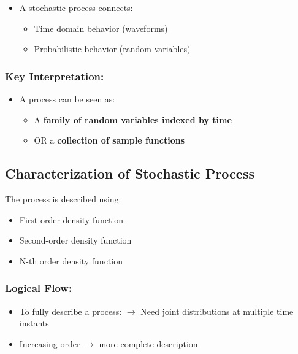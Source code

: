 \documentclass[12pt]{article}
\begin{document}
\begin{itemize}
    \item A stochastic process connects:
    \begin{itemize}
        \item Time domain behavior (waveforms)
        \item Probabilistic behavior (random variables)
    \end{itemize}
\end{itemize}

\subsubsection*{Key Interpretation:}

\begin{itemize}
    \item A process can be seen as:
    \begin{itemize}
        \item A \textbf{family of random variables indexed by time}
        \item OR a \textbf{collection of sample functions}
    \end{itemize}
\end{itemize}

\subsection{Characterization of Stochastic Process}

The process is described using:

\begin{itemize}
    \item First-order density function
    \item Second-order density function
    \item N-th order density function
\end{itemize}

\subsubsection*{Logical Flow:}

\begin{itemize}
    \item To fully describe a process:
    $\rightarrow$ Need joint distributions at multiple time instants
    \item Increasing order $\rightarrow$ more complete description
\end{itemize}
\end{document}
